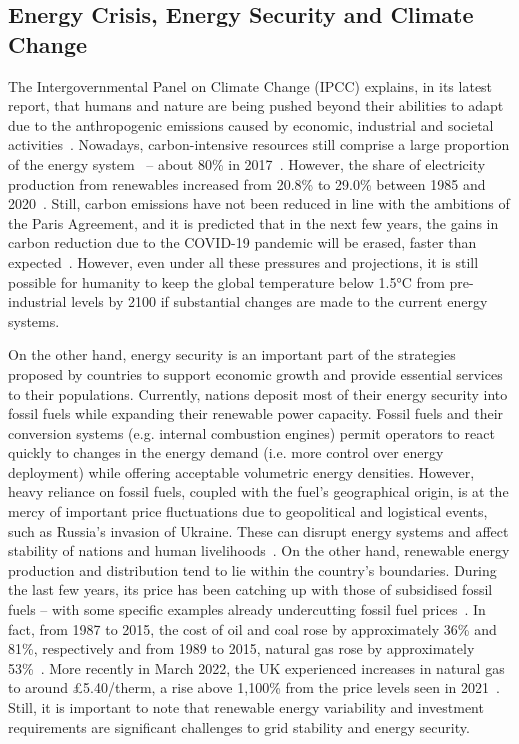 \subsection{Energy Crisis, Energy Security and Climate Change}

The Intergovernmental Panel on Climate Change (IPCC) explains, in its latest report, that humans and nature are being pushed beyond their abilities to adapt due to the anthropogenic emissions caused by economic, industrial and societal activities~\cite{IPCC2022Portner}. Nowadays, carbon-intensive resources still comprise a large proportion of the energy system~\cite{IPCC2022Portner} – about 80\% in 2017~\cite{raturi2019renewables}. However, the share of electricity production from renewables increased from 20.8\% to 29.0\% between 1985 and 2020~\cite{BP2021bp}. Still, carbon emissions have not been reduced in line with the ambitions of the Paris Agreement, and it is predicted that in the next few years, the gains in carbon reduction due to the COVID-19 pandemic will be erased, faster than expected~\cite{WEO2021IEA}. However, even under all these pressures and projections, it is still possible for humanity to keep the global temperature below 1.5°C from pre-industrial levels by 2100 if substantial changes are made to the current energy systems.

On the other hand, energy security is an important part of the  strategies proposed by countries to support economic growth and provide essential services to their populations. Currently, nations deposit most of their energy security into fossil fuels while expanding their renewable power capacity. Fossil fuels and their conversion systems (e.g. internal combustion engines) permit operators to react quickly to changes in the energy demand (i.e. more control over energy deployment) while offering acceptable volumetric energy densities. However, heavy reliance on fossil fuels, coupled with the fuel’s geographical origin, is at the mercy of important price fluctuations due to geopolitical and logistical events, such as Russia’s invasion of Ukraine. These can disrupt energy systems and affect stability of nations and human livelihoods~\cite{bhattacharyya2009fossil,russiagas}. On the other hand, renewable energy production and distribution tend to lie within the country's boundaries. During the last few years, its price has been catching up with those of subsidised fossil fuels – with some specific examples already undercutting fossil fuel prices~\cite{IRENA2021Renewable}. In fact, from 1987 to 2015, the cost of oil and coal rose by approximately 36\% and 81\%, respectively and from 1989 to 2015, natural gas rose by approximately 53\%~\cite{BP2016bp}. More recently in March 2022, the UK experienced increases in natural gas to around £5.40/therm, a rise above 1,100\% from the price levels seen in 2021~\cite{T2022UKNatureGas}. Still, it is important to note that renewable energy variability and investment requirements are significant challenges to grid stability and energy security.

